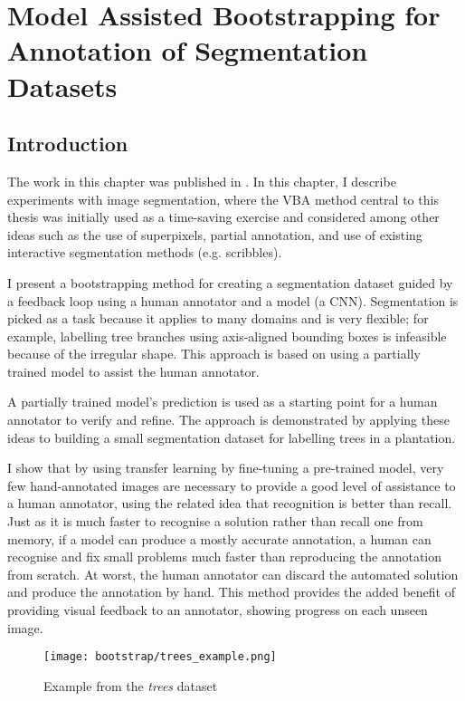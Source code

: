 \chapter{Model Assisted Bootstrapping for Annotation of Segmentation Datasets}
\label{chap:bootstrap} 
 
 
\section {Introduction}

The work in this chapter was published in \cite{Batchelorh}. In this chapter, I describe experiments with image segmentation, where the \gls{VBA} method central to this thesis was initially used as a time-saving exercise and considered among other ideas such as the use of superpixels, partial annotation, and use of existing interactive segmentation methods (e.g. scribbles).

I present a bootstrapping method for creating a segmentation dataset guided by a feedback loop using a human annotator and a model (a \gls{CNN}). Segmentation is picked as a task because it applies to many domains and is very flexible; for example, labelling tree branches using axis-aligned bounding boxes is infeasible because of the irregular shape. This approach is based on using a partially trained model to assist the human annotator.

 A partially trained model's prediction is used as a starting point for a human annotator to verify and refine. The approach is demonstrated by applying these ideas to building a small segmentation dataset for labelling trees in a plantation. 

I show that by using transfer learning by fine-tuning a pre-trained model, very few hand-annotated images are necessary to provide a good level of assistance to a human annotator, using the related idea that recognition is better than recall. Just as it is much faster to recognise a solution rather than recall one from memory, if a model can produce a mostly accurate annotation, a human can recognise and fix small problems much faster than reproducing the annotation from scratch. At worst, the human annotator can discard the automated solution and produce the annotation by hand. This method provides the added benefit of providing visual feedback to an annotator, showing progress on each unseen image.

\begin{figure}[ht]
\centering
\texttt{[image: bootstrap/trees\_example.png]}

\caption{Example from the \emph{trees} dataset}
\label{fig:bootstrap_tree}
\end{figure}

